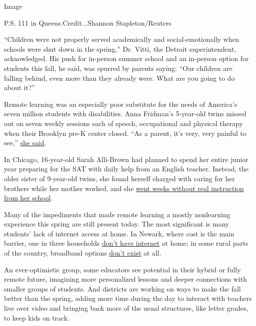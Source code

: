 Image

P.S. 111 in Queens.Credit...Shannon Stapleton/Reuters

``Children were not properly served academically and social-emotionally
when schools were shut down in the spring,'' Dr. Vitti, the Detroit
superintendent, acknowledged. His push for in-person summer school and
an in-person option for students this fall, he said, was spurred by
parents saying: ``Our children are falling behind, even more than they
already were. What are you going to do about it?''

Remote learning was an especially poor substitute for the needs of
America's seven million students with disabilities. Anna Fridman's
5-year-old twins missed out on seven weekly sessions each of speech,
occupational and physical therapy when their Brooklyn pre-K center
closed. ``As a parent, it's very, very painful to see,''
\href{https://ny.chalkbeat.org/2020/6/17/21295121/remote-learning-special-education-nyc}{she
said}.

In Chicago, 16-year-old Sarah Alli-Brown had planned to spend her entire
junior year preparing for the SAT with daily help from an English
teacher. Instead, the older sister of 9-year-old twins, she found
herself charged with caring for her brothers while her mother worked,
and she
\href{https://www.chalkbeat.org/2020/4/1/21225435/two-brothers-to-care-for-little-classwork-sat-worries-for-this-16-year-old-days-now-feel-like-weeks}{went
weeks without real instruction from her school}.

Many of the impediments that made remote learning a mostly nonlearning
experience this spring are still present today. The most significant is
many students' lack of internet access at home. In Newark, where cost is
the main barrier, one in three households
\href{https://newark.chalkbeat.org/2020/3/20/21196093/newark-students-will-get-laptops-free-internet-during-school-closure}{don't
have internet} at home; in some rural parts of the country, broadband
options
\href{https://in.chalkbeat.org/2020/5/28/21273890/how-the-politics-behind-rural-internet-access-leave-parts-of-indiana-in-the-dark-ages}{don't
exist} at all.

An ever-optimistic group, some educators see potential in their hybrid
or fully remote future, imagining more personalized lessons and deeper
connections with smaller groups of students. And districts are working
on ways to make the fall better than the spring, adding more time during
the day to interact with teachers live over video and bringing back more
of the usual structures, like letter grades, to keep kids on track.

